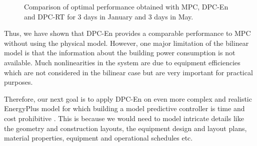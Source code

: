 \begin{figure}[h!]
{	}
	\caption{Comparison of optimal performance obtained with MPC, DPC-En and DPC-RT for 3 days in January and 3 days in May.}
	\label{F:comparison}
	\captionsetup{justification=centering}
\end{figure}

Thus, we have shown that DPC-En provides a comparable performance to MPC without using the physical model.
However, one major limitation of the bilinear model is that the information about the building power consumption is not available. Much nonlinearities in the system are due to equipment efficiencies which are not considered in the bilinear case but are very important for practical purposes. 

Therefore, our next goal is to apply DPC-En on even more complex and realistic EnergyPlus model for which building a model predictive controller is time and cost prohibitive \cite{Sturzenegger2016}. This is because we would need to model intricate details like the geometry and construction layouts, the equipment design and layout plans, material properties, equipment and operational schedules etc.

